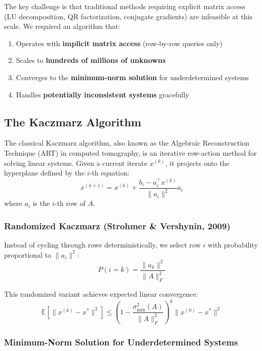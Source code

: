\documentclass[11pt,a4paper]{article}
\begin{document}
The key challenge is that traditional methods requiring explicit matrix access (LU decomposition, QR factorization, conjugate gradients) are infeasible at this scale. We required an algorithm that:
\begin{enumerate}
    \item Operates with \textbf{implicit matrix access} (row-by-row queries only)
    \item Scales to \textbf{hundreds of millions of unknowns}
    \item Converges to the \textbf{minimum-norm solution} for underdetermined systems
    \item Handles \textbf{potentially inconsistent systems} gracefully
\end{enumerate}

\subsection{The Kaczmarz Algorithm}

The classical Kaczmarz algorithm, also known as the Algebraic Reconstruction Technique (ART) in computed tomography, is an iterative row-action method for solving linear systems. Given a current iterate $x^{(k)}$, it projects onto the hyperplane defined by the $i$-th equation:
\begin{equation}
    x^{(k+1)} = x^{(k)} + \frac{b_i - a_i^\top x^{(k)}}{\|a_i\|^2} a_i
\end{equation}
where $a_i$ is the $i$-th row of $A$.

\subsubsection{Randomized Kaczmarz (Strohmer \& Vershynin, 2009)}

Instead of cycling through rows deterministically, we select row $i$ with probability proportional to $\|a_i\|^2$:
\begin{equation}
    P(i = k) = \frac{\|a_k\|^2}{\|A\|_F^2}
\end{equation}

This randomized variant achieves expected linear convergence:
\begin{equation}
    \mathbb{E}\left[\|x^{(k)} - x^*\|^2\right] \leq \left(1 - \frac{\sigma_{\min}^2(A)}{\|A\|_F^2}\right)^k \|x^{(0)} - x^*\|^2
\end{equation}

\subsubsection{Minimum-Norm Solution for Underdetermined Systems}
\end{document}
